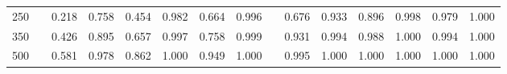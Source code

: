 % 
\begin{tabular}{ccccccccccccccc}
  \hline
  \hline
250 &  & 0.218 & 0.758 & 0.454 & 0.982 & 0.664 & 0.996 &  & 0.676 & 0.933 & 0.896 & 0.998 & 0.979 & 1.000 \\ 
  350 &  & 0.426 & 0.895 & 0.657 & 0.997 & 0.758 & 0.999 &  & 0.931 & 0.994 & 0.988 & 1.000 & 0.994 & 1.000 \\ 
  500 &  & 0.581 & 0.978 & 0.862 & 1.000 & 0.949 & 1.000 &  & 0.995 & 1.000 & 1.000 & 1.000 & 1.000 & 1.000 \\ 
   \hline
\end{tabular}
